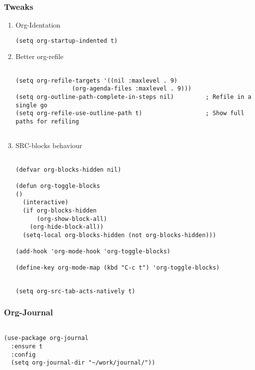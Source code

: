 \documentclass[11pt]{article}
\begin{document}
\subsubsection{Tweaks}
\label{sec:org96efd5d}
\begin{enumerate}
\item Org-Identation
\label{sec:orgad19625}
\begin{verbatim}
(setq org-startup-indented t)
\end{verbatim}
\item Better org-refile
\label{sec:org9559a4f}
\begin{verbatim}

(setq org-refile-targets '((nil :maxlevel . 9)
				(org-agenda-files :maxlevel . 9)))
(setq org-outline-path-complete-in-steps nil)         ; Refile in a single go
(setq org-refile-use-outline-path t)                  ; Show full paths for refiling


\end{verbatim}
\item SRC-blocks behaviour
\label{sec:org1c57689}
\begin{verbatim}

(defvar org-blocks-hidden nil)

(defun org-toggle-blocks
()
  (interactive)
  (if org-blocks-hidden
      (org-show-block-all)
    (org-hide-block-all))
  (setq-local org-blocks-hidden (not org-blocks-hidden)))

(add-hook 'org-mode-hook 'org-toggle-blocks)

(define-key org-mode-map (kbd "C-c t") 'org-toggle-blocks)
\end{verbatim}
\begin{verbatim}

(setq org-src-tab-acts-natively t)

\end{verbatim}
\end{enumerate}

\subsubsection{Org-Journal}
\label{sec:org16ba93f}

\begin{verbatim}

(use-package org-journal
  :ensure t
  :config
  (setq org-journal-dir "~/work/journal/"))

\end{verbatim}
\end{document}
